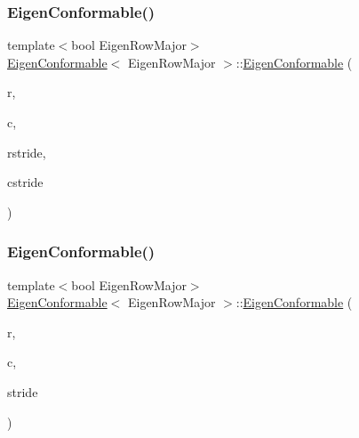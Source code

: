 \mbox{\label{struct_eigen_conformable_a54b71e05fb8b9dc914cc3c52c8ca9a34}} 
\subsubsection{\texorpdfstring{EigenConformable()}{EigenConformable()}\hspace{0.1cm}{\footnotesize\ttfamily [2/3]}}
{\footnotesize\ttfamily template$<$bool Eigen\+Row\+Major$>$ \\
\mbox{\hyperlink{struct_eigen_conformable}{Eigen\+Conformable}}$<$ Eigen\+Row\+Major $>$\+::\mbox{\hyperlink{struct_eigen_conformable}{Eigen\+Conformable}} (\begin{DoxyParamCaption}\item[{\mbox{\hyperlink{eigen_8h_a4e595ab182718d84a409dd05e0829bdd}{Eigen\+Index}}}]{r,  }\item[{\mbox{\hyperlink{eigen_8h_a4e595ab182718d84a409dd05e0829bdd}{Eigen\+Index}}}]{c,  }\item[{\mbox{\hyperlink{eigen_8h_a4e595ab182718d84a409dd05e0829bdd}{Eigen\+Index}}}]{rstride,  }\item[{\mbox{\hyperlink{eigen_8h_a4e595ab182718d84a409dd05e0829bdd}{Eigen\+Index}}}]{cstride }\end{DoxyParamCaption})\hspace{0.3cm}{\ttfamily [inline]}}

\mbox{\label{struct_eigen_conformable_a5e9a4c9c561bfc0bc8fba49eb196f242}} 
\subsubsection{\texorpdfstring{EigenConformable()}{EigenConformable()}\hspace{0.1cm}{\footnotesize\ttfamily [3/3]}}
{\footnotesize\ttfamily template$<$bool Eigen\+Row\+Major$>$ \\
\mbox{\hyperlink{struct_eigen_conformable}{Eigen\+Conformable}}$<$ Eigen\+Row\+Major $>$\+::\mbox{\hyperlink{struct_eigen_conformable}{Eigen\+Conformable}} (\begin{DoxyParamCaption}\item[{\mbox{\hyperlink{eigen_8h_a4e595ab182718d84a409dd05e0829bdd}{Eigen\+Index}}}]{r,  }\item[{\mbox{\hyperlink{eigen_8h_a4e595ab182718d84a409dd05e0829bdd}{Eigen\+Index}}}]{c,  }\item[{\mbox{\hyperlink{eigen_8h_a4e595ab182718d84a409dd05e0829bdd}{Eigen\+Index}}}]{stride }\end{DoxyParamCaption})\hspace{0.3cm}{\ttfamily [inline]}}




